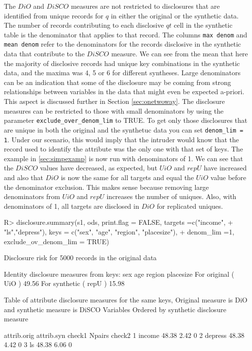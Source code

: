 \documentclass[12pt]{article}
\renewcommand{\baselinestretch}{1.5} %
\begin{document}
The $DiO$ and $DiSCO$ measures are not restricted to disclosures that are identified from unique records for $q$ in either the original or the synthetic data. The number of records contributing to each disclosive $qt$ cell in the synthetic table is the denominator that applies to that record. The columns \texttt{max denom} and \texttt{mean denom} refer to the denominators for the records disclosive in the synthetic data that contribute to the $DiSCO$ measure. We can see from the mean that here the majority of disclosive records had unique key combinations in the synthetic data, and the maxima was 4, 5 or 6 for different syntheses. Large denominators can be an indication that some of the disclosure may be coming from strong relationships between variables in the data that might even be expected a-priori. This aspect is discussed further in Section \ref{sec:onetwoway}. The disclosure measures can be restricted to those with small denominators by using
the parameter \texttt{exclude\_over\_denom\_lim} to TRUE. To get only those disclosures that are unique in both the original and the synthetuc data you can set \texttt{denom\_lim = 1}. Under our scenario, this would imply that the intruder would know that the record used to identify the attribute was the  only one with that set of keys. The 
example in \ref{sec:simpexamp} is now run with denominators of 1. We can see that the $DiSCO$ values have decreased, as expected, but $UiO$ and $repU$
have increased and also that $DiO$ is now the same for all targets and equal the $UiO$ value before the denominator exclusion. This makes sense because 
removing large denominators from $UiO$ and $repU$ increases the number of uniques. Also, with denominators of 1, all targets are disclosed in $DiO$
for replicated uniques.
\renewcommand{\baselinestretch}{1.0}
\begin{Schunk}
\begin{Sinput}
R> disclosure.summary(s1, ods,  print.flag = FALSE, targets =c("income",
+          "ls","depress"), keys = c("sex", "age", "region", "placesize"),
+            denom_lim =1, exclude_ov_denom_lim = TRUE)
\end{Sinput}
\begin{Soutput}
Disclosure risk for 5000 records in the original data

Identity disclosure measures
from keys: sex age region placesize 
For original  ( UiO )  49.56 %
For synthetic ( repU ) 15.98 %

Table of attribute disclosure measures for the same keys, 
Original measure is  DiO and synthetic measure is DiSCO 
Variables Ordered by synthetic disclosure measure

          attrib.orig attrib.syn check1 Npairs check2
1 income        48.38       2.42             0       
2 depress       48.38       4.42             0       
3 ls            48.38       6.06             0       
\end{Soutput}
\end{Schunk}
\end{document}
